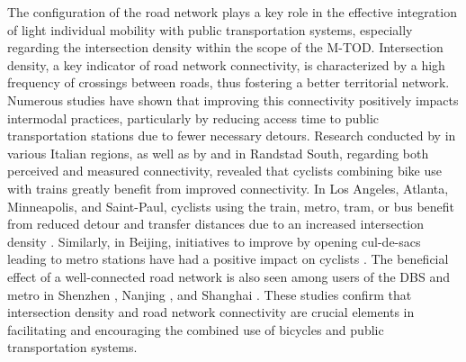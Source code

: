 \begin{refsegment}
The configuration of the road network plays a key role in the effective integration of light individual mobility with public transportation systems, especially regarding the intersection density within the scope of the \acrshort{M-TOD}. Intersection density, a key indicator of road network connectivity, is characterized by a high frequency of crossings between roads, thus fostering a better territorial network. Numerous studies have shown that improving this connectivity positively impacts intermodal practices, particularly by reducing access time to public transportation stations due to fewer necessary detours. Research conducted by \textcolor{blue}{\textcite[8]{giansoldati_train-feeder_2021}} in various Italian regions, as well as by \textcolor{blue}{\textcite[4-7]{geurs_multi-modal_2016}} and \textcolor{blue}{\textcite[45]{la_paix_puello_modelling_2015}} in Randstad South, regarding both perceived and measured connectivity, revealed that cyclists combining bike use with trains greatly benefit from improved connectivity. In Los Angeles, Atlanta, Minneapolis, and Saint-Paul, cyclists using the train, metro, tram, or bus benefit from reduced detour and transfer distances due to an increased intersection density \textcolor{blue}{\autocite[26]{hochmair_assessment_2015}}. Similarly, in Beijing, initiatives to improve  by opening cul-de-sacs leading to metro stations have had a positive impact on cyclists \textcolor{blue}{\autocite[6]{wang_interchange_2016}}. The beneficial effect of a well-connected road network is also seen among users of the \acrshort{DBS} and metro in Shenzhen \textcolor{blue}{\autocite[6]{wang_relationship_2020}}, Nanjing \textcolor{blue}{\autocite[182]{cheng_exploring_2022}}, and Shanghai \textcolor{blue}{\autocite[30]{lin_analysis_2019}}. These studies confirm that intersection density and road network connectivity are crucial elements in facilitating and encouraging the combined use of bicycles and public transportation systems.%


\end{refsegment}
